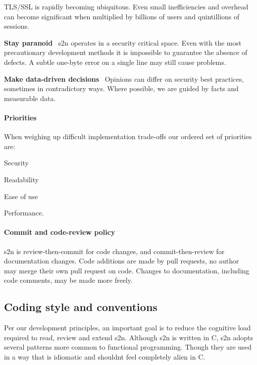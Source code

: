 \begin{DoxyItemize}
T\+L\+S/\+S\+SL is rapidly becoming ubiquitous. Even small inefficiencies and overhead can become significant when multiplied by billions of users and quintillions of sessions.
\item {\bfseries Stay paranoid}~\newline
s2n operates in a security critical space. Even with the most precautionary development methods it is impossible to guarantee the absence of defects. A subtle one-\/byte error on a single line may still cause problems.
\item {\bfseries Make data-\/driven decisions}~\newline
Opinions can differ on security best practices, sometimes in contradictory ways. Where possible, we are guided by facts and measurable data.
\end{DoxyItemize}

\paragraph*{Priorities}

When weighing up difficult implementation trade-\/offs our ordered set of priorities are\+:


\begin{DoxyEnumerate}
\item Security
\item Readability
\item Ease of use
\item Performance.
\end{DoxyEnumerate}

\paragraph*{Commit and code-\/review policy}

s2n is review-\/then-\/commit for code changes, and commit-\/then-\/review for documentation changes. Code additions are made by pull requests, no author may merge their own pull request on code. Changes to documentation, including code comments, may be made more freely.

\subsection*{Coding style and conventions}

Per our development principles, an important goal is to reduce the cognitive load required to read, review and extend s2n. Although s2n is written in C, s2n adopts several patterns more common to functional programming. Though they are used in a way that is idiomatic and shouldn\textquotesingle{}t feel completely alien in C.

